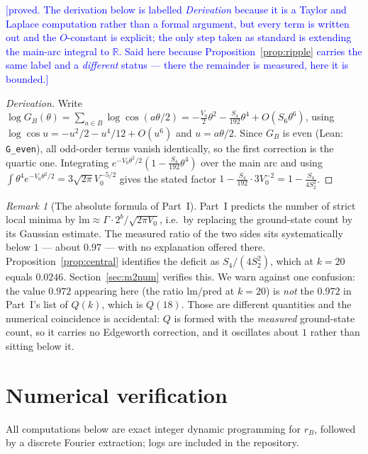 \documentclass[11pt,a4paper]{article}
\theoremstyle{plain}
\theoremstyle{definition}
\theoremstyle{remark}
\newtheorem{remark}[theorem]{Remark}
\newcommand{\Lean}[1]{\texttt{#1}}
\newcommand{\STATUS}[1]{\textcolor{blue}{\textsf{[#1]}}}
\begin{document}
\STATUS{proved. The derivation below is labelled \emph{Derivation} because it is a Taylor and
Laplace computation rather than a formal argument, but every term is written out and the
$O$-constant is explicit; the only step taken as standard is extending the main-arc integral to
$\mathbb{R}$. Said here because Proposition~\ref{prop:ripple} carries the same label and a
\emph{different} status --- there the remainder is measured, here it is bounded.}

\begin{proof}[Derivation]
Write $\log G_B(\theta)=\sum_{a\in B}\log\cos(a\theta/2)
=-\tfrac{V_0}{2}\theta^{2}-\tfrac{S_4}{192}\theta^{4}+O(S_6\theta^{6})$, using
$\log\cos u=-u^{2}/2-u^{4}/12+O(u^{6})$ and $u=a\theta/2$. Since $G_B$ is even
(Lean: \Lean{G\_even}), all odd-order terms vanish identically, so the first
correction is the quartic one. Integrating
$e^{-V_0\theta^{2}/2}(1-\tfrac{S_4}{192}\theta^{4})$ over the main arc and using
$\int\theta^{4}e^{-V_0\theta^{2}/2}=3\sqrt{2\pi}V_0^{-5/2}$ gives the stated
factor $1-\tfrac{S_4}{192}\cdot 3V_0^{-2}=1-\tfrac{S_4}{4S_2^{2}}$.
\end{proof}

\begin{remark}[The absolute formula of Part~I]\label{rem:absolute}
Part~I predicts the number of strict local minima by
$\mathrm{lm}\approx\Gamma\cdot 2^{b}/\sqrt{2\pi V_0}$, i.e.\ by replacing the
ground-state count by its Gaussian estimate. The measured ratio of the two sides
sits systematically below $1$ --- about $0.97$ --- with no explanation offered
there. Proposition~\ref{prop:central} identifies the deficit as
$S_4/(4S_2^{2})$, which at $k=20$ equals $0.0246$. Section~\ref{sec:m2num}
verifies this. We warn against one confusion: the value $0.972$ appearing here
(the ratio $\mathrm{lm}/\mathrm{pred}$ at $k=20$) is \emph{not} the $0.972$ in
Part~I's list of $Q(k)$, which is $Q(18)$. Those are different
quantities and the numerical coincidence is accidental: $Q$ is formed with the
\emph{measured} ground-state count, so it carries no Edgeworth correction, and
it oscillates about $1$ rather than sitting below it.
\end{remark}

\section{Numerical verification}\label{sec:num}

All computations below are exact integer dynamic programming for $r_B$, followed
by a discrete Fourier extraction; logs are included in the repository.
\end{document}
